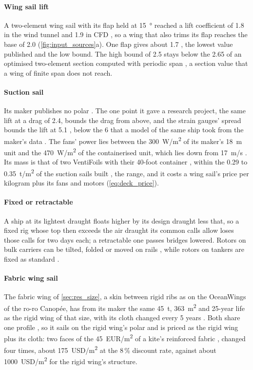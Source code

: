 \paragraph{Wing sail lift} A two-element wing sail with its flap held at \SI{15}{\degree} reached a lift coefficient of 1.8 in the wind tunnel and 1.9 in CFD \citep{wright2024wingsail}, so a wing that also trims its flap reaches the base of 2.0 (\cref{fig:input_sources}a). One flap gives about 1.7 \citep{rechevilanova2021}, the lowest value published and the low bound. The high bound of 2.5 stays below the 2.65 of an optimised two-element section computed with periodic span \citep{yao2026}, a section value that a wing of finite span does not reach.

\paragraph{Suction sail} Its maker publishes no polar \citep{ghorbani2024suction}. The one point it gave a research project, the same lift at a drag of 2.4, bounds the drag from above, and the strain gauges' spread bounds the lift at 5.1 \citep{ghorbani2024suction}, below the 6 that a model of the same ship took from the maker's data \citep{wasp2023wp3}. The fans' power lies between the \SI{300}{W/m^2} of its maker's \SI{18}{m} unit \citep{econowind2026vf3} and the \SI{470}{W/m^2} of the containerised unit, which lies down from \SI{17}{m/s} \citep{conoship2022econowind}. Its mass is that of two VentiFoils with their 40-foot container \citep{conoship2022econowind}, within the 0.29 to \SI{0.35}{t/m^2} of the suction sails built \citep{emsa2023}, the range, and it costs a wing sail's price per kilogram plus its fans and motors (\cref{eq:deck_price}).

\paragraph{Fixed or retractable} A ship at its lightest draught floats higher by its design draught less that, so a fixed rig whose top then exceeds the air draught its common calls allow loses those calls for two days each; a retractable one passes bridges lowered. Rotors on bulk carriers can be tilted, folded or moved on rails \citep{gcaptain2021seazhoushan,maritimeexecutive2024sohar,anemoi2026}, while rotors on tankers are fixed as standard \citep{anemoi_deploy}.

\paragraph{Fabric wing sail} The fabric wing of \cref{sec:res_size}, a skin between rigid ribs as on the OceanWings of the ro-ro Canopée, has from its maker the same \SI{45}{t}, \SI{363}{m^2} and 25-year life as the rigid wing of that size, with its cloth changed every 5 years \citep{oceanwings2026lf}. Both share one profile \citep{oceanwings2024posidonia}, so it sails on the rigid wing's polar and is priced as the rigid wing plus its cloth: two faces of the \SI{45}{EUR/m^2} of a kite's reinforced fabric \citep{joshi2024refeconomic}, changed four times, about \SI{175}{USD/m^2} at the 8\,\% discount rate, against about \SI{1000}{USD/m^2} for the rigid wing's structure.

